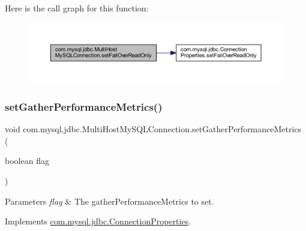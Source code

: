 Here is the call graph for this function\+:
\nopagebreak
\begin{figure}[H]
\begin{center}
\leavevmode
\includegraphics[width=350pt]{classcom_1_1mysql_1_1jdbc_1_1_multi_host_my_s_q_l_connection_a17dcc1cedd18c886c23b8afd43a22cfe_cgraph}
\end{center}
\end{figure}
\mbox{\label{classcom_1_1mysql_1_1jdbc_1_1_multi_host_my_s_q_l_connection_a06b568a697c11663a400405c5c8998cb}} 
\subsubsection{\texorpdfstring{set\+Gather\+Performance\+Metrics()}{setGatherPerformanceMetrics()}}
{\footnotesize\ttfamily void com.\+mysql.\+jdbc.\+Multi\+Host\+My\+S\+Q\+L\+Connection.\+set\+Gather\+Performance\+Metrics (\begin{DoxyParamCaption}\item[{boolean}]{flag }\end{DoxyParamCaption})}


\begin{DoxyParams}{Parameters}
{\em flag} & The gather\+Performance\+Metrics to set. \\
\hline
\end{DoxyParams}


Implements \mbox{\hyperlink{interfacecom_1_1mysql_1_1jdbc_1_1_connection_properties_a8083ba3dcac8d6d8ec42c635f0f19be4}{com.\+mysql.\+jdbc.\+Connection\+Properties}}.

